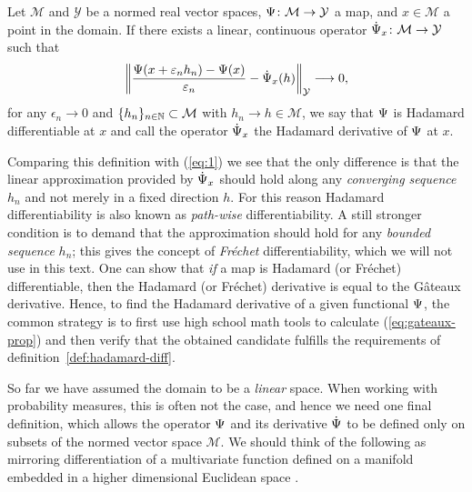 \documentclass[a4,danish]{article}
\begin{document}
\begin{definition}
  \label{def:hadamard-diff}
  Let $\mathcal{M}$ and $\mathcal{Y}$ be a normed real vector spaces,
  $\operatorname{\Psi} \colon \mathcal{M} \rightarrow \mathcal{Y}$ a map, and $x \in \mathcal{M}$ a point in the
  domain. If there exists a linear, continuous operator
  $\dot{\operatorname{\Psi}}_x \colon \mathcal{M} \rightarrow \mathcal{Y} $ such that
  \begin{equation*}
    \left\Vert
      \frac{\operatorname{\Psi}(x + \varepsilon_n h_n) - \operatorname{\Psi}(x)}{\varepsilon_n} - \dot{\operatorname{\Psi}}_x(h)
    \right\Vert_{\mathcal{Y}} \longrightarrow 0,
  \end{equation*}
  for any $\epsilon_n \rightarrow 0$ and $\{h_n\}_{n \in \mathbb{N}} \subset \mathcal{M}$ with
  $h_n \rightarrow h \in \mathcal{M}$, we say that $\operatorname{\Psi}$ is Hadamard differentiable at $x$ and call
  the operator $\dot{\operatorname{\Psi}}_x$ the Hadamard derivative of $\operatorname{\Psi}$ at $x$.
\end{definition}

Comparing this definition with (\ref{eq:1}) we see that the only
difference is that the linear approximation provided by $\dot{\operatorname{\Psi}}_x$
should hold along any \textit{converging sequence} $h_n$ and not
merely in a fixed direction $h$. For this reason Hadamard
differentiability is also known as \textit{path-wise}
differentiability. A still stronger condition is to demand that the
approximation should hold for any \textit{bounded sequence} $h_n$;
this gives the concept of \textit{Fréchet} differentiability, which we
will not use in this text. One can show that \textit{if} a map is
Hadamard (or Fréchet) differentiable, then the Hadamard (or Fréchet)
derivative is equal to the Gâteaux derivative. Hence, to find the
Hadamard derivative of a given functional $\operatorname{\Psi}$, the common strategy
is to first use high school math tools to calculate
(\ref{eq:gateaux-prop}) and then verify that the obtained candidate
fulfills the requirements of definition~\ref{def:hadamard-diff}.

So far we have assumed the domain to be a \textit{linear} space. When
working with probability measures, this is often not the case, and
hence we need one final definition, which allows the operator $\operatorname{\Psi}$
and its derivative $\dot{\operatorname{\Psi}}$ to be defined only on subsets of the
normed vector space $\mathcal{M}$. We should think of the following as
mirroring differentiation of a multivariate function defined on a
manifold embedded in a higher dimensional Euclidean space
.
\end{document}
